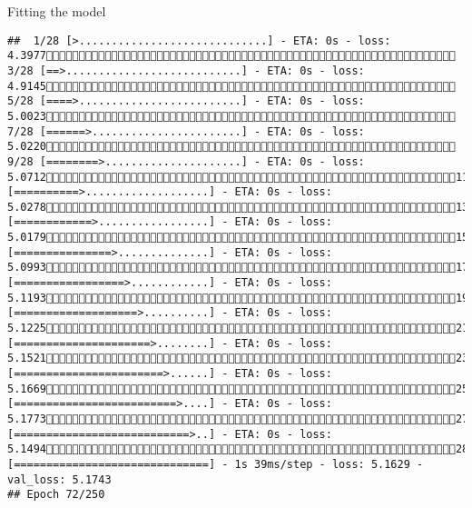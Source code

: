 \documentclass[
  ignorenonframetext,
]{beamer}
\begin{document}
\begin{frame}[fragile]{Fitting the model}
\begin{verbatim}
##  1/28 [>.............................] - ETA: 0s - loss: 4.3977 3/28 [==>...........................] - ETA: 0s - loss: 4.9145 5/28 [====>.........................] - ETA: 0s - loss: 5.0023 7/28 [======>.......................] - ETA: 0s - loss: 5.0220 9/28 [========>.....................] - ETA: 0s - loss: 5.071211/28 [==========>...................] - ETA: 0s - loss: 5.027813/28 [============>.................] - ETA: 0s - loss: 5.017915/28 [===============>..............] - ETA: 0s - loss: 5.099317/28 [=================>............] - ETA: 0s - loss: 5.119319/28 [===================>..........] - ETA: 0s - loss: 5.122521/28 [=====================>........] - ETA: 0s - loss: 5.152123/28 [=======================>......] - ETA: 0s - loss: 5.166925/28 [=========================>....] - ETA: 0s - loss: 5.177327/28 [===========================>..] - ETA: 0s - loss: 5.149428/28 [==============================] - 1s 39ms/step - loss: 5.1629 - val_loss: 5.1743
## Epoch 72/250

\end{verbatim}
\end{frame}
\end{document}
